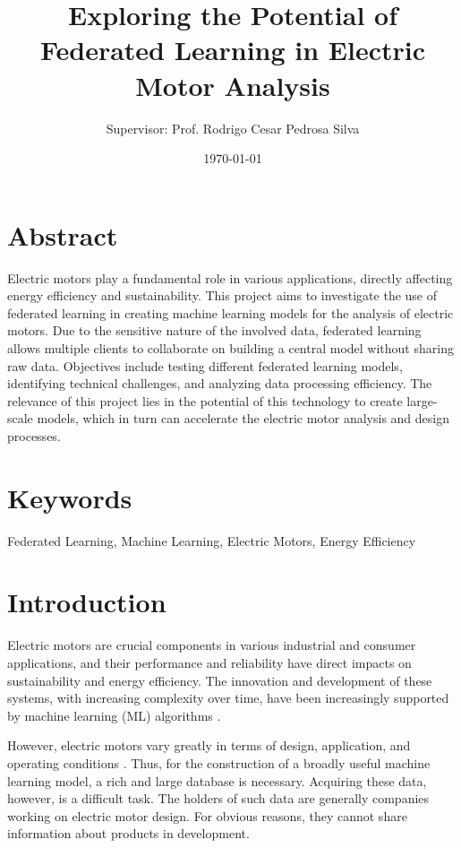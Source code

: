 \documentclass{article}
\title{Exploring the Potential of Federated Learning in Electric Motor Analysis}
\author{Supervisor: Prof. Rodrigo Cesar Pedrosa Silva \\
}
\date{\today}
\begin{document}
\maketitle

\section*{Abstract}

Electric motors play a fundamental role in various applications, directly affecting energy efficiency and sustainability. This project aims to investigate the use of federated learning in creating machine learning models for the analysis of electric motors. Due to the sensitive nature of the involved data, federated learning allows multiple clients to collaborate on building a central model without sharing raw data. Objectives include testing different federated learning models, identifying technical challenges, and analyzing data processing efficiency. The relevance of this project lies in the potential of this technology to create large-scale models, which in turn can accelerate the electric motor analysis and design processes.

\section*{Keywords}

Federated Learning, Machine Learning, Electric Motors, Energy Efficiency

\section{Introduction}

Electric motors are crucial components in various industrial and consumer applications, and their performance and reliability have direct impacts on sustainability and energy efficiency. The innovation and development of these systems, with increasing complexity over time, have been increasingly supported by machine learning (ML) algorithms \cite{silva2018multiple,khan2019deep,raia2023multiattribute}.

However, electric motors vary greatly in terms of design, application, and operating conditions \cite{silva2018multiple,ibrahim2021surrogate}. Thus, for the construction of a broadly useful machine learning model, a rich and large database is necessary. Acquiring these data, however, is a difficult task. The holders of such data are generally companies working on electric motor design. For obvious reasons, they cannot share information about products in development.
\end{document}
